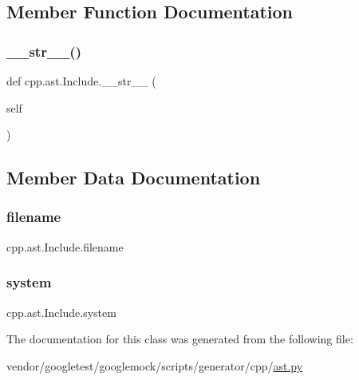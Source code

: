 \subsection{Member Function Documentation}
\mbox{\label{classcpp_1_1ast_1_1_include_ad7d9e5e8f46dcb1a91a282e609412a3e}} 
\subsubsection{\texorpdfstring{\+\_\+\+\_\+str\+\_\+\+\_\+()}{\_\_str\_\_()}}
{\footnotesize\ttfamily def cpp.\+ast.\+Include.\+\_\+\+\_\+str\+\_\+\+\_\+ (\begin{DoxyParamCaption}\item[{}]{self }\end{DoxyParamCaption})}



\subsection{Member Data Documentation}
\mbox{\label{classcpp_1_1ast_1_1_include_a9ecff64f127655d3c17e9abe4ebe3852}} 
\subsubsection{\texorpdfstring{filename}{filename}}
{\footnotesize\ttfamily cpp.\+ast.\+Include.\+filename}

\mbox{\label{classcpp_1_1ast_1_1_include_a2e8e535b1af7d9b0ff94d0ae9f86e5c5}} 
\subsubsection{\texorpdfstring{system}{system}}
{\footnotesize\ttfamily cpp.\+ast.\+Include.\+system}



The documentation for this class was generated from the following file\+:\begin{DoxyCompactItemize}
\item 
vendor/googletest/googlemock/scripts/generator/cpp/\hyperlink{ast_8py}{ast.\+py}\end{DoxyCompactItemize}
